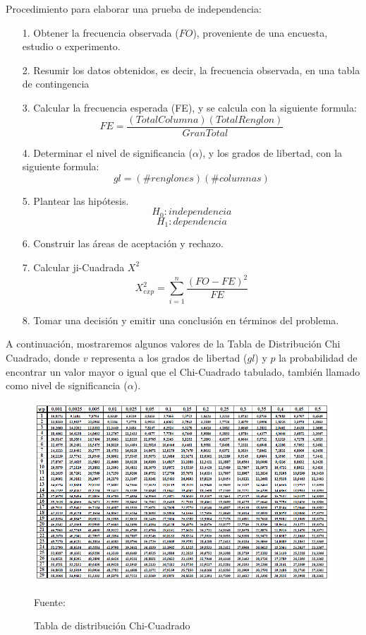 \vskip 0.5cm
Procedimiento para elaborar una prueba de independencia:
\begin{enumerate}
\item[1.] Obtener la frecuencia observada ($FO$), proveniente de una encuesta, estudio o experimento.
\item[2.] Resumir los datos obtenidos, es decir, la frecuencia observada, en una tabla de contingencia
\item[3.] Calcular la frecuencia esperada (FE), y se calcula con la siguiente formula:
\[ FE = \frac{(Total Columna)(Total Renglon)}{Gran Total} \]
\item[4.] Determinar el nivel de significancia ($\alpha$), y los grados de libertad, con la siguiente formula:
\[ gl = (\#renglones)(\#columnas) \]
\item[5.] Plantear las hipótesis.
\[ H_{0}: independencia \]
\[ H_{1}: dependencia \]
\item[6.] Construir las áreas de aceptación y rechazo.
\item[7.] Calcular ji-Cuadrada $X^{2}$
\[ X^{2}_{exp} = \sum_{i=1}^{n} \frac{(FO - FE)^2}{FE} \]
\item[8.] Tomar una decisión y emitir una conclusión en términos del problema.
\end{enumerate}

A continuación, mostraremos algunos valores de la Tabla de Distribución Chi Cuadrado, donde $v$ representa a los grados de libertad ($gl$) y $p$ la probabilidad de encontrar un valor mayor o igual que el Chi-Cuadrado tabulado, también llamado como nivel de significancia ($\alpha$).

\begin{figure}[ht]
\begin{center}
\includegraphics[width=1\textwidth]{Imagenes/Apendice/image001}
\end{center}
\begin{center}
\vskip -0.5cm
\caption{\small{Tabla de distribución Chi-Cuadrado}}
\label{fig:figuraA.1}
{\small{Fuente: \cite{eyra}}}
\end{center}
\end{figure}

